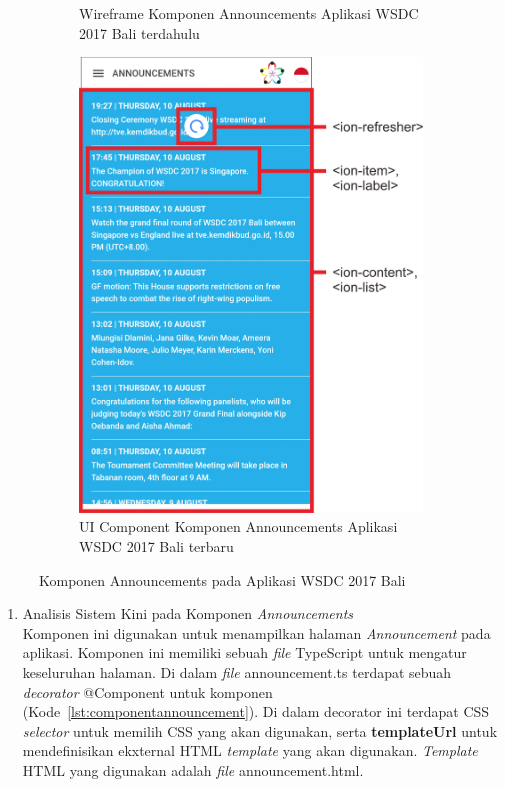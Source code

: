 \begin{enumerate}
\begin{figure}[H]
\begin{subfigure}[b]{0.43\textwidth}
         	\caption{Wireframe Komponen Announcements Aplikasi WSDC 2017 Bali terdahulu}
         	\label{fig:announcementsPageWireframe}
     	\end{subfigure}
     	\hspace*{0.5in}
     	\begin{subfigure}[b]{0.43\textwidth}
         	\centering
         	\includegraphics[scale=0.4]{Gambar/AnnouncementsPageKini.png}
         	\caption{UI Component Komponen Announcements Aplikasi WSDC 2017 Bali terbaru}
         	\label{fig:AnnouncementsPageKini}
     	\end{subfigure}
        \caption{Komponen Announcements pada Aplikasi WSDC 2017 Bali}
        \label{fig:UIComponent1}
	\end{figure}
	
	\begin{enumerate}
		\item Analisis Sistem Kini pada Komponen \textit{Announcements} \\
		Komponen ini digunakan untuk menampilkan halaman \textit{Announcement} pada aplikasi. Komponen ini memiliki sebuah \textit{file} TypeScript untuk mengatur keseluruhan halaman. Di dalam \textit{file} announcement.ts terdapat sebuah \textit{decorator} @Component untuk komponen (Kode~\ref{lst:componentannouncement}). Di dalam decorator ini terdapat CSS \textit{selector} untuk memilih CSS yang akan digunakan, serta \textbf{templateUrl} untuk mendefinisikan ekxternal HTML \textit{template} yang akan digunakan. \textit{Template} HTML yang digunakan adalah \textit{file} announcement.html. 
		

\end{enumerate}
\end{enumerate}

